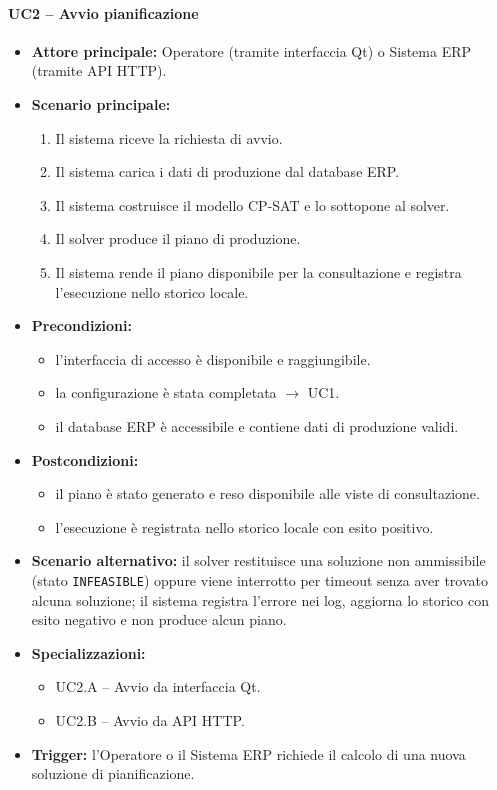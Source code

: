 \paragraph{UC2 -- Avvio pianificazione}
\begin{itemize}
    \item \textbf{Attore principale:} Operatore (tramite interfaccia Qt) o Sistema ERP (tramite API HTTP).
    \item \textbf{Scenario principale:}
    \begin{enumerate}
        \item Il sistema riceve la richiesta di avvio.
        \item Il sistema carica i dati di produzione dal database ERP.
        \item Il sistema costruisce il modello CP-SAT e lo sottopone al solver.
        \item Il solver produce il piano di produzione.
        \item Il sistema rende il piano disponibile per la consultazione e registra l'esecuzione nello storico locale.
    \end{enumerate}
    \item \textbf{Precondizioni:}
    \begin{itemize}
        \item l'interfaccia di accesso è disponibile e raggiungibile.
        \item la configurazione è stata completata $\rightarrow$ UC1.
        \item il database ERP è accessibile e contiene dati di produzione validi.
    \end{itemize}
    \item \textbf{Postcondizioni:}
    \begin{itemize}
        \item il piano è stato generato e reso disponibile alle viste di consultazione.
        \item l'esecuzione è registrata nello storico locale con esito positivo.
    \end{itemize}
    \item \textbf{Scenario alternativo:} il solver restituisce una soluzione non ammissibile (stato \texttt{INFEASIBLE}) oppure viene interrotto per timeout senza aver trovato alcuna soluzione; il sistema registra l'errore nei log, aggiorna lo storico con esito negativo e non produce alcun piano.
    \item \textbf{Specializzazioni:}
    \begin{itemize}
        \item UC2.A -- Avvio da interfaccia Qt.
        \item UC2.B -- Avvio da API HTTP.
    \end{itemize}
    \item \textbf{Trigger:} l'Operatore o il Sistema ERP richiede il calcolo di una nuova soluzione di pianificazione.
\end{itemize}


